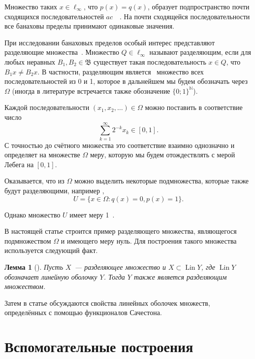 \documentclass[a4paper,14pt]{article} %
\theoremstyle{plain}
\newtheorem{lemma}{Лемма}[section]
\begin{document}
Множество таких $x\in\ell_\infty$, что $p(x)=q(x)$,
образует подпространство почти сходящихся последовательностей $ac$~~\cite{lorentz1948contribution}.
На почти сходящейся последовательности все банаховы пределы принимают одинаковые значения.

При исследовании банаховых пределов особый интерес представляют разделяющие множества~\cite[\S 3]{Semenov2014geomprops}.
Множество $Q\in\ell_\infty$ называют разделяющим, если
для любых неравных $B_1, B_2\in\mathfrak{B}$ существует такая последовательность $x\in Q$,
что $B_1 x \neq B_2 x$.
В частности, разделяющим является~\cite{semenov2010characteristic} множество всех последовательностей из 0 и 1,
которое в дальнейшем мы будем обозначать через $\Omega$
(иногда в литературе встречается также обозначение $\{0;1\}^\mathbb{N}$).

Каждой последовательности $(x_1, x_2, \dots)\in \Omega$ можно поставить в соответствие число
\begin{equation}\label{eq:bijection_omega_0_1}
	\sum_{k=1}^\infty 2^{-k} x_k \in [0,1]
	.
\end{equation}
С точностью до счётного множества это соответствие взаимно однозначно и определяет на множестве $\Omega$ меру,
которую мы будем отождествлять с мерой Лебега на $[0,1]$.

Оказывается, что из $\Omega$ можно выделить некоторые подмножества, которые также будут разделяющими,
например \cite[\S 3, Теорема 11]{Semenov2014geomprops},
\begin{equation}
	U = \{ x\in\Omega: q(x) = 0, p(x) = 1 \}
	.
\end{equation}

Однако множество $U$ имеет меру 1~\cite{semenov2010characteristic}.

В настоящей статье строится пример разделяющего множества,
являющегося подмножеством $\Omega$ и имеющего меру нуль.
Для построения такого множества используется следующий факт.

\begin{lemma}[{\cite[\S 3, замечание 6]{Semenov2014geomprops}}]
	Пусть $X$~--- разделяющее множество и $X \subset \operatorname{Lin} Y$,
	где $\operatorname{Lin} Y$ обозначает линейную оболочку $Y$.
	Тогда $Y$ также является разделяющим множеством.
\end{lemma}
Затем в статье обсуждаются свойства линейных оболочек множеств, определённых с помощью функционалов Сачестона.

\section{Вспомогательные построения}
\end{document}
